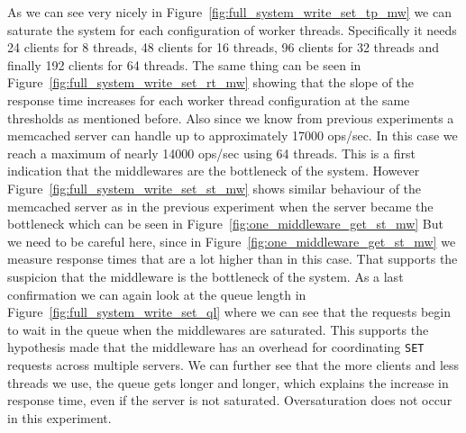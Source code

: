 \documentclass[11pt,a4paper]{article}
\begin{document}
%
As we can see very nicely in Figure~\ref{fig:full_system_write_set_tp_mw} we can saturate the system for each configuration of worker threads.
%
Specifically it needs 24 clients for 8 threads, 48 clients for 16 threads, 96 clients for 32 threads and finally 192 clients for 64 threads.
%
The same thing can be seen in Figure~\ref{fig:full_system_write_set_rt_mw} showing that the slope of the response time increases for each worker thread configuration at the same thresholds as mentioned before.
%
Also since we know from previous experiments a memcached server can handle up to approximately 17000 ops/sec.
%
In this case we reach a maximum of nearly 14000 ops/sec using 64 threads.
%
This is a first indication that the middlewares are the bottleneck of the system.
%
However Figure~\ref{fig:full_system_write_set_st_mw} shows similar behaviour of the memcached server as in the previous experiment when the server became the bottleneck which can be seen in Figure~\ref{fig:one_middleware_get_st_mw}
%
But we need to be careful here, since in Figure~\ref{fig:one_middleware_get_st_mw} we measure response times that are a lot higher than in this case.
%
That supports the suspicion that the middleware is the bottleneck of the system.
%
As a last confirmation we can again look at the queue length in Figure~\ref{fig:full_system_write_set_ql} where we can see that the requests begin to wait in the queue when the middlewares are saturated.
%
This supports the hypothesis made that the middleware has an overhead for coordinating \texttt{SET} requests across multiple servers.
%
We can further see that the more clients and less threads we use, the queue gets longer and longer, which explains the increase in response time, even if the server is not saturated.
%
Oversaturation does not occur in this experiment.
%
\end{document}
